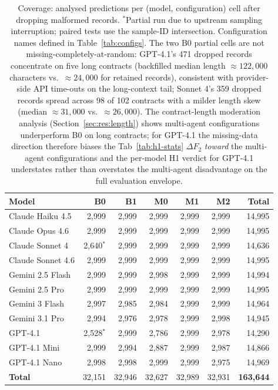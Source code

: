 \begin{table}[htbp]
  \centering
  \small
  \caption{Coverage: analysed predictions per (model, configuration) cell after
  dropping malformed records. ${}^*$Partial run due to upstream sampling interruption;
  paired tests use the sample-ID intersection. Configuration names defined in
  Table~\ref{tab:configs}. The two B0 partial cells are not missing-completely-at-random:
  GPT-4.1's 471 dropped records concentrate on five long contracts (backfilled
  median length ${\approx}122{,}000$ characters vs.\ ${\approx}24{,}000$ for retained
  records), consistent with provider-side API time-outs on the long-context tail;
  Sonnet 4's 359 dropped records spread across 98 of 102 contracts with a milder
  length skew (median ${\approx}31{,}000$ vs.\ ${\approx}26{,}000$). The
  contract-length moderation analysis (Section~\ref{sec:res:length}) shows
  multi-agent configurations underperform B0 on long contracts; for GPT-4.1
  the missing-data direction therefore biases the Tab~\ref{tab:h1-stats}
  $\Delta F_2$ \emph{toward} the multi-agent configurations and the per-model
  H1 verdict for GPT-4.1 understates rather than overstates the multi-agent
  disadvantage on the full evaluation envelope.}
  \label{tab:coverage}
  \begin{tabular*}{\linewidth}{@{\extracolsep{\fill}}lrrrrrr@{}}
    \toprule
    \textbf{Model} & \textbf{B0} & \textbf{B1} & \textbf{M0} & \textbf{M1} &
    \textbf{M2} & \textbf{Total} \\
    \midrule
    Claude Haiku 4.5   & 2{,}999 & 2{,}999 & 2{,}999 & 2{,}999 & 2{,}999 & 14{,}995 \\
    Claude Opus 4.6    & 2{,}999 & 2{,}999 & 2{,}999 & 2{,}999 & 2{,}999 & 14{,}995 \\
    Claude Sonnet 4    & 2{,}640$^*$ & 2{,}999 & 2{,}999 & 2{,}999 & 2{,}999 & 14{,}636 \\
    Claude Sonnet 4.6  & 2{,}999 & 2{,}999 & 2{,}999 & 2{,}999 & 2{,}999 & 14{,}995 \\
    Gemini 2.5 Flash   & 2{,}999 & 2{,}999 & 2{,}998 & 2{,}999 & 2{,}999 & 14{,}994 \\
    Gemini 2.5 Pro     & 2{,}999 & 2{,}999 & 2{,}999 & 2{,}999 & 2{,}999 & 14{,}995 \\
    Gemini 3 Flash     & 2{,}997 & 2{,}985 & 2{,}984 & 2{,}999 & 2{,}999 & 14{,}964 \\
    Gemini 3.1 Pro     & 2{,}994 & 2{,}976 & 2{,}978 & 2{,}999 & 2{,}998 & 14{,}945 \\
    GPT-4.1            & 2{,}528$^*$ & 2{,}999 & 2{,}786 & 2{,}999 & 2{,}978 & 14{,}290 \\
    GPT-4.1 Mini       & 2{,}999 & 2{,}994 & 2{,}887 & 2{,}999 & 2{,}987 & 14{,}866 \\
    GPT-4.1 Nano       & 2{,}998 & 2{,}998 & 2{,}999 & 2{,}999 & 2{,}975 & 14{,}969 \\
    \midrule
    \textbf{Total}     & 32{,}151 & 32{,}946 & 32{,}627 & 32{,}989 & 32{,}931 &
    \textbf{163{,}644} \\
    \bottomrule
  \end{tabular*}
\end{table}

